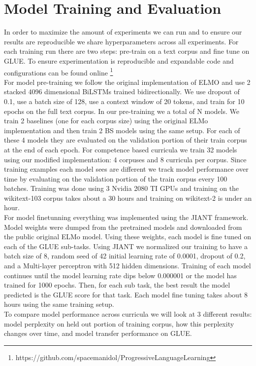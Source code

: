 \section{Model Training and Evaluation}
\label{chap:method:sec:training}
In order to maximize the amount of experiments we can run and to ensure our results are reproducible we share hyperparameters across all experiments. For each training run there are two steps: pre-train on a text corpus and fine tune on GLUE. To ensure experimentation is reproducible and expandable code and configurations can be found online \footnote{https://github.com/spacemanidol/ProgressiveLanguageLearning} \\
For model pre-training we follow the original implementation of ELMO and use 2 stacked 4096 dimensional BiLSTMs trained bidirectionally. We use dropout of 0.1, use a batch size of 128, use a context window of 20 tokens, and train for 10 epochs on the full text corpus. In our pre-training we a total of N models. We train 2 baselines (one for each corpus size) using the original ELMo implementation and then train 2 BS models using the same setup. For each of these 4 models they are evaluated on the validation portion of their train corpus at the end of each epoch.  For competence based curricula we train 32 models using our modified implementation: 4 corpuses and 8 curricula per corpus. Since training examples each model sees are different we track model performance over time by evaluating on the validation portion of the train corpus every 100 batches.  Training was done using 3 Nvidia 2080 TI GPUs and training on the wikitext-103 corpus takes about a 30 hours and training on wikitext-2 is under an hour. \\ 
For model finetunning everything was implemented using the JIANT framework. Model weights were dumped from the pretrained models and downloaded from the public original ELMo model. Using these weights, each model is fine tuned on each of the GLUE sub-tasks. Using JIANT we normalized our training to have a batch size of 8, random seed of 42 initial learning rate of 0.0001, dropout of 0.2, and a Multi-layer perceptron with 512 hidden dimensions. Training of each model continues until the model learning rate dips below 0.000001 or the model has trained for 1000 epochs. Then, for each sub task, the best result the model predicted is the GLUE score for that task. Each model fine tuning takes about 8 hours using the same training setup. \\
To compare model performance across curricula we will look at 3 different results: model perplexity on held out portion of training corpus, how this perplexity changes over time, and model transfer performance on GLUE. 